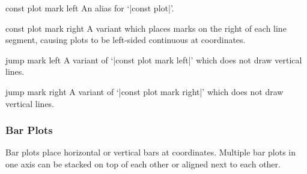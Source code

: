\begin{plottype}{const plot mark left}
An alias for `|const plot|'.
\end{plottype}

\begin{plottype}{const plot mark right}
 A variant which places marks on the right of each line segment, causing plots to be left-sided continuous at coordinates.
\begin{codeexample}[]
\end{codeexample}
\end{plottype}

\begin{plottype}{jump mark left}
A variant of `|const plot mark left|' which does not draw vertical lines.
\begin{codeexample}[]
\end{codeexample}
\end{plottype}

\begin{plottype}{jump mark right}
A variant of `|const plot mark right|' which does not draw vertical lines.
\end{plottype}

\subsubsection{Bar Plots}
Bar plots place horizontal or vertical bars at coordinates. Multiple bar plots in one axis can be stacked on top of each other or aligned next to each other.

